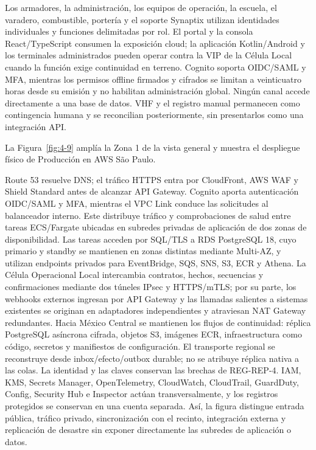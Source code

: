 Los armadores, la administración, los equipos de operación, la escuela, el varadero, combustible, portería y el soporte Synaptix utilizan identidades individuales y funciones delimitadas por rol. El portal y la consola React/TypeScript consumen la exposición cloud; la aplicación Kotlin/Android y los terminales administrados pueden operar contra la VIP de la Célula Local cuando la función exige continuidad en terreno. Cognito soporta OIDC/SAML y MFA, mientras los permisos offline firmados y cifrados se limitan a veinticuatro horas desde su emisión y no habilitan administración global. Ningún canal accede directamente a una base de datos. VHF y el registro manual permanecen como contingencia humana y se reconcilian posteriormente, sin presentarlos como una integración API.

La Figura~\ref{fig:4-9} amplía la Zona 1 de la vista general y muestra el despliegue físico de Producción en AWS São Paulo.



Route 53 resuelve DNS; el tráfico HTTPS entra por CloudFront, AWS WAF y Shield Standard antes de alcanzar API Gateway. Cognito aporta autenticación OIDC/SAML y MFA, mientras el VPC Link conduce las solicitudes al balanceador interno. Este distribuye tráfico y comprobaciones de salud entre tareas ECS/Fargate ubicadas en subredes privadas de aplicación de dos zonas de disponibilidad. Las tareas acceden por SQL/TLS a RDS PostgreSQL 18, cuyo primario y standby se mantienen en zonas distintas mediante Multi-AZ, y utilizan endpoints privados para EventBridge, SQS, SNS, S3, ECR y Athena. La Célula Operacional Local intercambia contratos, hechos, secuencias y confirmaciones mediante dos túneles IPsec y HTTPS/mTLS; por su parte, los webhooks externos ingresan por API Gateway y las llamadas salientes a sistemas existentes se originan en adaptadores independientes y atraviesan NAT Gateway redundantes. Hacia México Central se mantienen los flujos de continuidad: réplica PostgreSQL asíncrona cifrada, objetos S3, imágenes ECR, infraestructura como código, secretos y manifiestos de configuración. El transporte regional se reconstruye desde inbox/efecto/outbox durable; no se atribuye réplica nativa a las colas. La identidad y las claves conservan las brechas de REG-REP-4. IAM, KMS, Secrets Manager, OpenTelemetry, CloudWatch, CloudTrail, GuardDuty, Config, Security Hub e Inspector actúan transversalmente, y los registros protegidos se conservan en una cuenta separada. Así, la figura distingue entrada pública, tráfico privado, sincronización con el recinto, integración externa y replicación de desastre sin exponer directamente las subredes de aplicación o datos.

